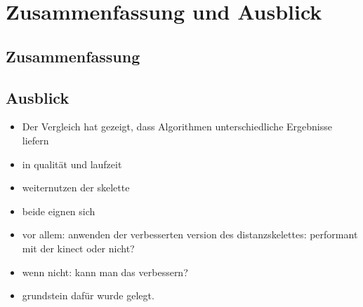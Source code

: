 \chapter{Zusammenfassung und Ausblick}
\section{Zusammenfassung}
\section{Ausblick}
\begin{itemize}
\item Der Vergleich hat gezeigt, dass Algorithmen unterschiedliche Ergebnisse liefern
\item in qualität und laufzeit
\item weiternutzen der skelette
\item beide eignen sich
\item vor allem: anwenden der verbesserten version des distanzskelettes: performant mit der kinect oder nicht?
\item wenn nicht: kann man das verbessern?
\item grundstein dafür wurde gelegt. 
\end{itemize}
